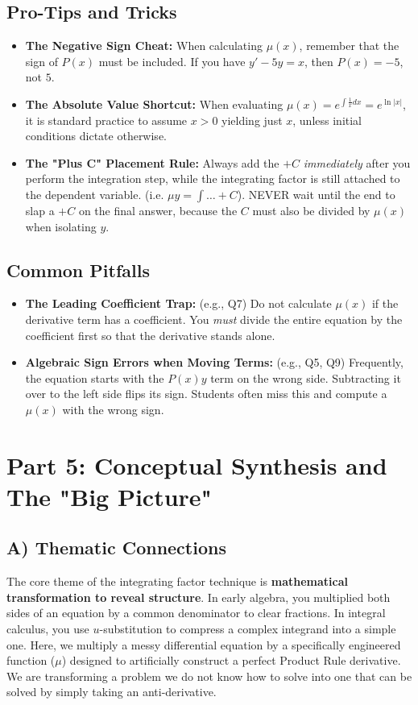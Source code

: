 \documentclass[11pt]{article}
\begin{document}
\subsection{Pro-Tips and Tricks}
\begin{itemize}
    \item \textbf{The Negative Sign Cheat:} When calculating $\mu(x)$, remember that the sign of $P(x)$ must be included. If you have $y' - 5y = x$, then $P(x) = -5$, not $5$.
    \item \textbf{The Absolute Value Shortcut:} When evaluating $\mu(x) = e^{\int \frac{1}{x} dx} = e^{\ln|x|}$, it is standard practice to assume $x > 0$ yielding just $x$, unless initial conditions dictate otherwise.
    \item \textbf{The "Plus C" Placement Rule:} Always add the $+C$ \textit{immediately} after you perform the integration step, while the integrating factor is still attached to the dependent variable. (i.e. $\mu y = \int \dots + C$). NEVER wait until the end to slap a $+C$ on the final answer, because the $C$ must also be divided by $\mu(x)$ when isolating $y$.
\end{itemize}

\subsection{Common Pitfalls}
\begin{itemize}
    \item \textbf{The Leading Coefficient Trap:} (e.g., Q7) Do not calculate $\mu(x)$ if the derivative term has a coefficient. You \textit{must} divide the entire equation by the coefficient first so that the derivative stands alone.
    \item \textbf{Algebraic Sign Errors when Moving Terms:} (e.g., Q5, Q9) Frequently, the equation starts with the $P(x)y$ term on the wrong side. Subtracting it over to the left side flips its sign. Students often miss this and compute a $\mu(x)$ with the wrong sign.
\end{itemize}

\newpage
\section{Part 5: Conceptual Synthesis and The "Big Picture"}

\subsection{A) Thematic Connections}
The core theme of the integrating factor technique is \textbf{mathematical transformation to reveal structure}. In early algebra, you multiplied both sides of an equation by a common denominator to clear fractions. In integral calculus, you use $u$-substitution to compress a complex integrand into a simple one. Here, we multiply a messy differential equation by a specifically engineered function ($\mu$) designed to artificially construct a perfect Product Rule derivative. We are transforming a problem we do not know how to solve into one that can be solved by simply taking an anti-derivative.
\end{document}

